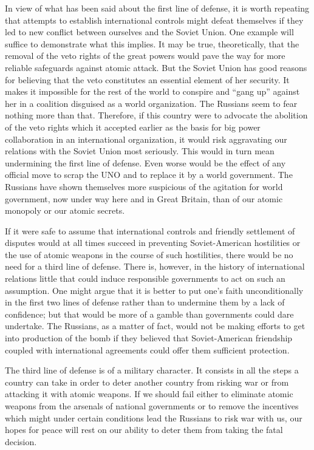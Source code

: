 In view of what has been said about the first line of defense, it is worth repeating that attempts to establish international controls might defeat themselves if they led to new conflict between ourselves and the Soviet Union. One example will suffice to demonstrate what this implies. It may be true, theoretically, that the removal of the veto rights of the great powers would pave the way for more reliable safeguards against atomic attack. But the Soviet Union has good reasons for believing that the veto constitutes an essential element of her security. It makes it impossible for the rest of the world to conspire and ``gang up'' against her in a coalition disguised as a world organization. The Russians seem to fear nothing more than that. Therefore, if this country were to advocate the abolition of the veto rights which it accepted earlier as the basis for big power collaboration in an international organization, it would risk aggravating our relations with the Soviet Union most seriously. This would in turn mean undermining the first line of defense. Even worse would be the effect of any official move to scrap the UNO and to replace it by a world government. The Russians have shown themselves more suspicious of the agitation for world government, now under way here and in Great Britain, than of our atomic monopoly or our atomic secrets.

If it were safe to assume that international controls and friendly settlement of disputes would at all times succeed in preventing Soviet-American hostilities or the use of atomic weapons in the course of such hostilities, there would be no need for a third line of defense. There is, however, in the history of international relations little that could induce responsible governments to act on such an assumption. One might argue that it is better to put one's faith unconditionally in the first two lines of defense rather than to undermine them by a lack of confidence; but that would be more of a gamble than governments could dare undertake. The Russians, as a matter of fact, would not be making efforts to get into production of the bomb if they believed that Soviet-American friendship coupled with international agreements could offer them sufficient protection.

The third line of defense is of a military character. It consists in all the steps a country can take in order to deter another country from risking war or from attacking it with atomic weapons. If we should fail either to eliminate atomic weapons from the arsenals of national governments or to remove the incentives which might under certain conditions lead the Russians to risk war with us, our hopes for peace will rest on our ability to deter them from taking the fatal decision.

